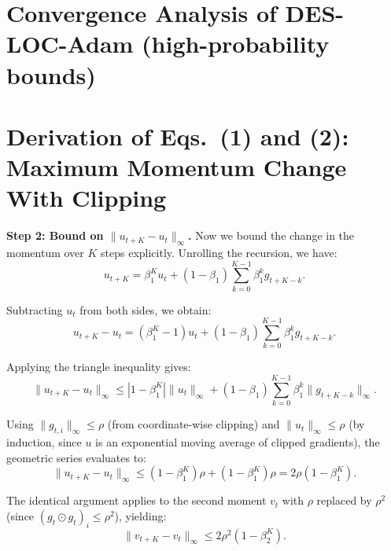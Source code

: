 \section{Convergence Analysis of DES-LOC-Adam (high-probability bounds)}
\label{sec:high_prob}

\section{Derivation of Eqs.\ (1) and (2): Maximum Momentum Change With Clipping}
\label{sec:drift_derivation}

\textbf{Step 2: Bound on $\|u_{t+K} - u_t\|_\infty$.} Now we bound the change in the momentum over $K$ steps
explicitly. Unrolling the recursion, we have:
\begin{equation}
u_{t+K} = \beta_1^K u_t + (1 - \beta_1) \sum_{k=0}^{K-1} \beta_1^k g_{t+K-k}.
\label{eq:unroll_u}
\end{equation}

Subtracting $u_t$ from both sides, we obtain:
\begin{equation}
u_{t+K} - u_t = (\beta_1^K - 1)u_t + (1 - \beta_1) \sum_{k=0}^{K-1} \beta_1^k g_{t+K-k}.
\label{eq:diff_u}
\end{equation}

Applying the triangle inequality gives:
\begin{equation}
\|u_{t+K} - u_t\|_\infty \leq |1 - \beta_1^K| \|u_t\|_\infty + (1 - \beta_1) \sum_{k=0}^{K-1} \beta_1^k \|g_{t+K-k}\|_\infty.
\label{eq:triangle_u}
\end{equation}

Using $\|g_{t,i}\|_\infty \leq \rho$ (from coordinate-wise clipping) and $\|u_t\|_\infty \leq \rho$ (by induction, since $u$ is an exponential moving average of clipped gradients), the geometric series evaluates to:
\begin{equation}
\|u_{t+K} - u_t\|_\infty \leq (1 - \beta_1^K)\rho + (1 - \beta_1^K)\rho = 2\rho(1 - \beta_1^K).
\end{equation}

The identical argument applies to the second moment $v_t$ with $\rho$ replaced by $\rho^2$ (since $(g_t \odot g_t)_i \leq \rho^2$), yielding:
\begin{equation}
\|v_{t+K} - v_t\|_\infty \leq 2\rho^2(1 - \beta_2^K).
\end{equation}

